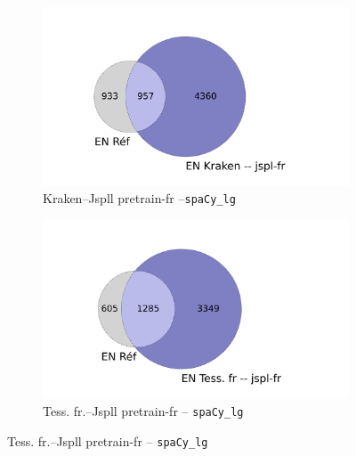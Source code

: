 \begin{figure}[h!]
    \begin{minipage}{6.5cm}
  \begin{subfigure}{1\textwidth}
  \includegraphics[width=1\textwidth]{IMAGES/INTERSECTIONS_GLOBALES/ELTeCFRA_Kraken -- jspl-fr_spacy-lg-concat_intersection.png} 
  \caption{Kraken--Jspll pretrain-fr --\texttt{spaCy\_lg}}
  \label{fig:ELTeCFRA_Kraken -- jspl-fr_spacy-lg-concat_intersection.png}
  \end{subfigure}
  \end{minipage}
  \begin{minipage}{6.5cm}
  \begin{subfigure}{1\textwidth}
  \includegraphics[width=1\textwidth]{IMAGES/INTERSECTIONS_GLOBALES/ELTeCFRA_Tess. fr -- jspl-fr_spacy-lg-concat_intersection.png} 
  \caption{Tess. fr.--Jspll pretrain-fr -- \texttt{spaCy\_lg}}
 \label{fig:ELTeCFRA_Tess. fr -- jspl-fr_spacy-lg-concat_intersection.png}
  \end{subfigure}
    \end{minipage}
\begin{minipage}{6.5cm}

\end{minipage}
\end{figure}
